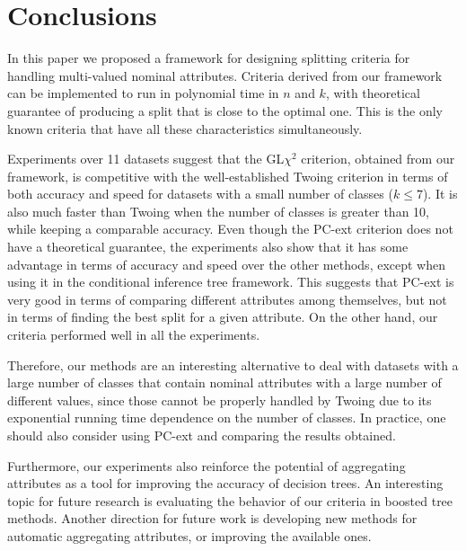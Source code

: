 \newpage

\chapter{Conclusions}
\label{chap:conclusions}

In this paper we proposed a framework for
designing splitting criteria for handling 
multi-valued nominal attributes.
Criteria derived from our framework 
can be implemented to run in polynomial time in
$n$ and $k$, with 
theoretical guarantee of producing a split that is close to the optimal
one. This is the only known criteria that have all these characteristics simultaneously.

Experiments over 11 datasets
suggest that the GL$\chi^2$ criterion, obtained from our framework, is competitive with the well-established Twoing criterion in terms of both accuracy and speed for datasets with a small number of classes ($k \leq 7$). It is also much faster than Twoing when the number of classes is greater than 10, while keeping a comparable accuracy. Even though the PC-ext criterion does not have a theoretical guarantee, the experiments also show that it has some advantage in terms of accuracy and speed over the other methods, except when using it in the conditional inference tree framework. This suggests that PC-ext is very good in terms of comparing different attributes among themselves, but not in terms of finding the best split for a given attribute. On the other hand, our criteria performed well in all the experiments.
 
Therefore, our methods are an interesting alternative to deal with
datasets with a large number of classes that contain nominal attributes with a large
number of different values, since those cannot be properly handled by Twoing due to its exponential running time dependence on the number of classes. In practice, one should also consider using PC-ext and comparing the results obtained.

Furthermore, our experiments also reinforce
the potential of  aggregating attributes as a tool 
for improving the accuracy of decision trees.
An interesting topic for  future research is evaluating the behavior of our criteria in boosted tree methods.
Another direction for future work is developing new methods for automatic aggregating attributes, or improving the available ones.
